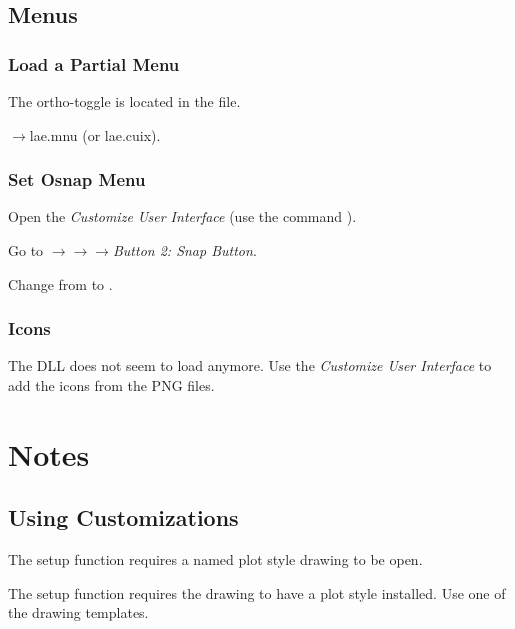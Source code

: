 \documentclass{lebook}
\begin{document}
\section{Menus}
\subsection{Load a Partial Menu}
The  ortho-toggle is located in the  file.
\begin{bulletedlist}
	\item {}$\rightarrow$lae.mnu (or lae.cuix).
\end{bulletedlist}

\subsection{Set Osnap Menu}
\begin{numberedlist}
	\item Open the \textit{Customize User Interface} (use the command ).
	\item Go to $\rightarrow$$\rightarrow$$\rightarrow$\textit{Button 2: Snap Button}.
	\item Change  from  to .
\end{numberedlist}

\subsection{Icons}
The DLL does not seem to load anymore.  Use the \textit{Customize User Interface} to add the icons from the PNG files.

\chapter{Notes}
\section{Using Customizations}
\begin{bulletedlist}
	\item The setup function requires a named plot style drawing to be open.
	\item The setup function requires the drawing to have a plot style installed.  Use one of the drawing templates.
\end{bulletedlist}
\end{document}
